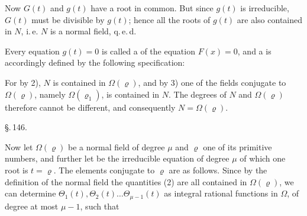 
Now $G(t)$ and $g(t)$ have a root in common. But since $g(t)$ is irreducible, $G(t)$ must be divisible by $g(t)$; hence all the roots of $g(t)$ are also contained in $N$, i.\,e. $N$ is a normal field, q.\,e.\,d.

Every equation $g(t) = 0$ is called a  of the equation $F(x) = 0$, and a  is accordingly defined by the following specification:


For by 2), $N$ is contained in $\Omega(\varrho)$, and by 3) one of the fields conjugate to $\Omega(\varrho)$, namely $\Omega(\varrho_1)$, is contained in $N$. The degrees of $N$ and $\Omega(\varrho)$ therefore cannot be different, and consequently $N = \Omega(\varrho)$.


\begin{center}
\S.\,146.

\end{center}

Now let $\Omega(\varrho)$ be a normal field of degree $\mu$ and $\varrho$ one of its primitive numbers, and further let
be the irreducible equation of degree $\mu$ of which one root is $t = \varrho$. The elements conjugate to $\varrho$ are as follows.
Since by the definition of the normal field the quantities (2) are all contained in $\Omega(\varrho)$, we can determine $\Theta_1(t), \Theta_2(t) \ldots \Theta_{\mu-1}(t)$ as integral rational functions in $\Omega$, of degree at most $\mu - 1$, such that
